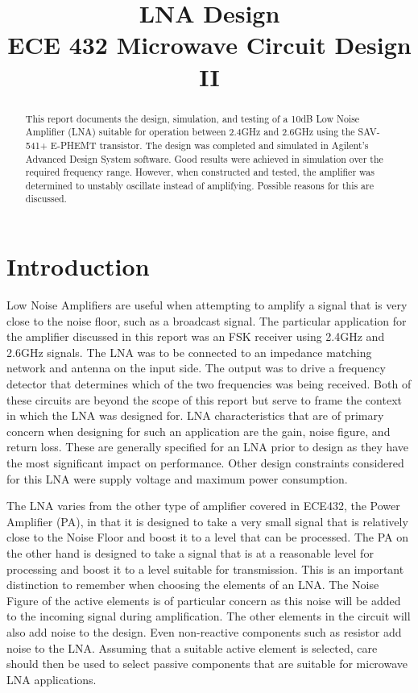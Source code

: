 \documentclass[conference]{IEEEtran}
\begin{document}
\title{LNA Design\\ECE 432 Microwave Circuit Design II}
\author{
}
\maketitle
\IEEEpeerreviewmaketitle

\begin{abstract}
This report documents the design, simulation, and testing of a 10dB Low Noise Amplifier (LNA) suitable for operation between 2.4GHz and 2.6GHz using the SAV-541+ E-PHEMT transistor. The design was completed and simulated in Agilent's Advanced Design System software. Good results were achieved in simulation over the required frequency range. However, when constructed and tested, the amplifier was determined to unstably oscillate instead of amplifying. Possible reasons for this are discussed.
\end{abstract}

\section{Introduction}
Low Noise Amplifiers are useful when attempting to amplify a signal that is very close to the noise floor, such as a broadcast signal. The particular application for the amplifier discussed in this report was an FSK receiver using 2.4GHz and 2.6GHz signals. The LNA was to be connected to an impedance matching network and antenna on the input side. The output was to drive a frequency detector that determines which of the two frequencies was being received. Both of these circuits are beyond the scope of this report but serve to frame the context in which the LNA was designed for. LNA characteristics that are of primary concern when designing for such an application are the gain, noise figure, and return loss. These are generally specified for an LNA prior to design as they have the most significant impact on performance. Other design constraints considered for this LNA were supply voltage and maximum power consumption.

The LNA varies from the other type of amplifier covered in ECE432, the Power Amplifier (PA), in that it is designed to take a very small signal that is relatively close to the Noise Floor and boost it to a level that can be processed. The PA on the other hand is designed to take a signal that is at a reasonable level for processing and boost it to a level suitable for transmission. This is an important distinction to remember when choosing the elements of an LNA. The Noise Figure of the active elements is of particular concern as this noise will be added to the incoming signal during amplification. The other elements in the circuit will also add noise to the design. Even non-reactive components such as resistor add noise to the LNA. Assuming that a suitable active element is selected, care should then be used to select passive components that are suitable for microwave LNA applications.
\end{document}
